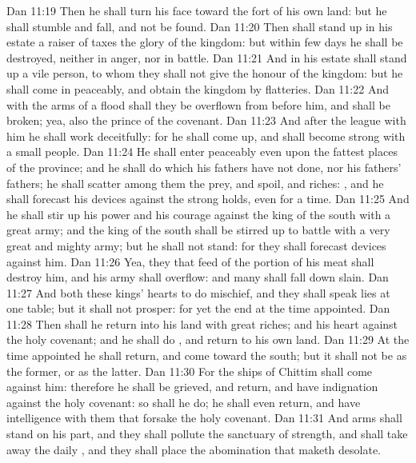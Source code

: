 \vs Dan 11:19 Then he shall turn his face toward the fort of his own land: but he shall stumble and fall, and not be found.
\vs Dan 11:20 Then shall stand up in his estate a raiser of taxes  the glory of the kingdom: but within few days he shall be destroyed, neither in anger, nor in battle.
\vs Dan 11:21 And in his estate shall stand up a vile person, to whom they shall not give the honour of the kingdom: but he shall come in peaceably, and obtain the kingdom by flatteries.
\vs Dan 11:22 And with the arms of a flood shall they be overflown from before him, and shall be broken; yea, also the prince of the covenant.
\vs Dan 11:23 And after the league  with him he shall work deceitfully: for he shall come up, and shall become strong with a small people.
\vs Dan 11:24 He shall enter peaceably even upon the fattest places of the province; and he shall do  which his fathers have not done, nor his fathers' fathers; he shall scatter among them the prey, and spoil, and riches: , and he shall forecast his devices against the strong holds, even for a time.
\vs Dan 11:25 And he shall stir up his power and his courage against the king of the south with a great army; and the king of the south shall be stirred up to battle with a very great and mighty army; but he shall not stand: for they shall forecast devices against him.
\vs Dan 11:26 Yea, they that feed of the portion of his meat shall destroy him, and his army shall overflow: and many shall fall down slain.
\vs Dan 11:27 And both these kings' hearts  to do mischief, and they shall speak lies at one table; but it shall not prosper: for yet the end  at the time appointed.
\vs Dan 11:28 Then shall he return into his land with great riches; and his heart  against the holy covenant; and he shall do , and return to his own land.
\vs Dan 11:29 At the time appointed he shall return, and come toward the south; but it shall not be as the former, or as the latter.
\vs Dan 11:30 For the ships of Chittim shall come against him: therefore he shall be grieved, and return, and have indignation against the holy covenant: so shall he do; he shall even return, and have intelligence with them that forsake the holy covenant.
\vs Dan 11:31 And arms shall stand on his part, and they shall pollute the sanctuary of strength, and shall take away the daily , and they shall place the abomination that maketh desolate.
